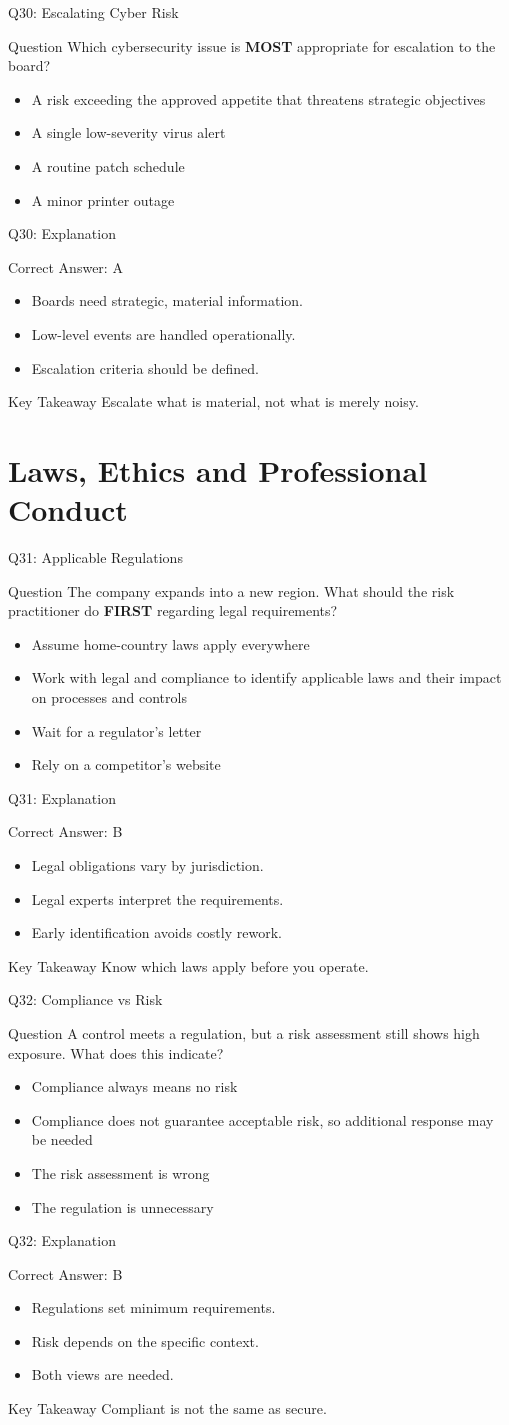 \documentclass[aspectratio=169]{beamer}
\newcommand{\hq}[7]{%
	\begin{frame}{Q#1: #2}
		\begin{block}{Question}
			#3
		\end{block}
		\begin{itemize}
			#4
		\end{itemize}
	\end{frame}
	\begin{frame}{Q#1: Explanation}
		\begin{block}{Correct Answer: #5}
			\begin{itemize}
				#6
			\end{itemize}
		\end{block}
		\begin{alertblock}{Key Takeaway}
			#7
		\end{alertblock}
	\end{frame}
}
\begin{document}
	\hq{30}{Escalating Cyber Risk}
	{Which cybersecurity issue is \textbf{MOST} appropriate for escalation to the board?}
	{\item[\textbf{(A)}] A risk exceeding the approved appetite that threatens strategic objectives
		\item[\textbf{(B)}] A single low-severity virus alert
		\item[\textbf{(C)}] A routine patch schedule
		\item[\textbf{(D)}] A minor printer outage}
	{A}
	{\item Boards need strategic, material information.
		\item Low-level events are handled operationally.
		\item Escalation criteria should be defined.}
	{Escalate what is material, not what is merely noisy.}
	
	\section{Laws, Ethics and Professional Conduct}
	
	\hq{31}{Applicable Regulations}
	{The company expands into a new region. What should the risk practitioner do \textbf{FIRST} regarding legal requirements?}
	{\item[\textbf{(A)}] Assume home-country laws apply everywhere
		\item[\textbf{(B)}] Work with legal and compliance to identify applicable laws and their impact on processes and controls
		\item[\textbf{(C)}] Wait for a regulator's letter
		\item[\textbf{(D)}] Rely on a competitor's website}
	{B}
	{\item Legal obligations vary by jurisdiction.
		\item Legal experts interpret the requirements.
		\item Early identification avoids costly rework.}
	{Know which laws apply before you operate.}
	
	\hq{32}{Compliance vs Risk}
	{A control meets a regulation, but a risk assessment still shows high exposure. What does this indicate?}
	{\item[\textbf{(A)}] Compliance always means no risk
		\item[\textbf{(B)}] Compliance does not guarantee acceptable risk, so additional response may be needed
		\item[\textbf{(C)}] The risk assessment is wrong
		\item[\textbf{(D)}] The regulation is unnecessary}
	{B}
	{\item Regulations set minimum requirements.
		\item Risk depends on the specific context.
		\item Both views are needed.}
	{Compliant is not the same as secure.}
	
\end{document}
